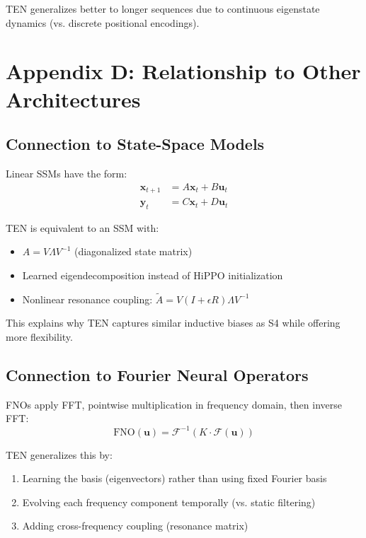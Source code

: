 \documentclass[11pt,letterpaper]{article}
\begin{document}
TEN generalizes better to longer sequences due to continuous eigenstate dynamics (vs. discrete positional encodings).

\section{Appendix D: Relationship to Other Architectures}

\subsection{Connection to State-Space Models}

Linear SSMs have the form:
\begin{align}
    \mathbf{x}_{t+1} &= A\mathbf{x}_t + B\mathbf{u}_t \\
    \mathbf{y}_t &= C\mathbf{x}_t + D\mathbf{u}_t
\end{align}

TEN is equivalent to an SSM with:
\begin{itemize}
    \item $A = V\Lambda V^{-1}$ (diagonalized state matrix)
    \item Learned eigendecomposition instead of HiPPO initialization
    \item Nonlinear resonance coupling: $\tilde{A} = V(I+\epsilon R)\Lambda V^{-1}$
\end{itemize}

This explains why TEN captures similar inductive biases as S4 while offering more flexibility.

\subsection{Connection to Fourier Neural Operators}

FNOs apply FFT, pointwise multiplication in frequency domain, then inverse FFT:
\begin{equation}
    \text{FNO}(\mathbf{u}) = \mathcal{F}^{-1}(K \cdot \mathcal{F}(\mathbf{u}))
\end{equation}

TEN generalizes this by:
\begin{enumerate}
    \item Learning the basis (eigenvectors) rather than using fixed Fourier basis
    \item Evolving each frequency component temporally (vs. static filtering)
    \item Adding cross-frequency coupling (resonance matrix)
\end{enumerate}
\end{document}

